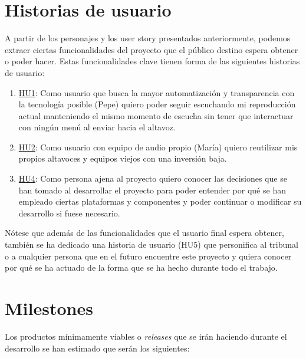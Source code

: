 \section{Historias de usuario}
A partir de los personajes y los user story presentados anteriormente, podemos
extraer ciertas funcionalidades del proyecto que el público destino espera
obtener o poder hacer. Estas funcionalidades clave tienen forma de las
siguientes historias de usuario:

\begin{enumerate}
    \item \href{https://github.com/migueorg/One-touch-music-streaming-TFG-ETSIIT/issues/10}{HU1}: Como usuario que busca la mayor automatización y transparencia
    con la tecnología posible (Pepe) quiero poder seguir escuchando mi
    reproducción actual manteniendo el mismo momento de escucha sin tener que
    interactuar con ningún menú al enviar hacia el altavoz.
    \item \href{https://github.com/migueorg/One-touch-music-streaming-TFG-ETSIIT/issues/11}{HU2}: Como usuario con equipo de audio propio (María) quiero reutilizar
    mis propios altavoces y equipos viejos con una inversión baja.
    \item \href{https://github.com/migueorg/One-touch-music-streaming-TFG-ETSIIT/issues/14}{HU4}: Como persona ajena al proyecto quiero conocer las decisiones que
    se han tomado al desarrollar el proyecto para poder entender por qué se han
    empleado ciertas plataformas y componentes y poder continuar o modificar su
    desarrollo si fuese necesario.
\end{enumerate}

Nótese que además de las funcionalidades que el usuario final espera obtener,
también se ha dedicado una historia de usuario (HU5) que personifica al tribunal o
a cualquier persona que en el futuro encuentre este proyecto y quiera conocer
por qué se ha actuado de la forma que se ha hecho durante todo el trabajo.

\section{Milestones}
Los productos mínimamente viables o \emph{releases} que se irán haciendo durante el
desarrollo se han estimado que serán los siguientes:

